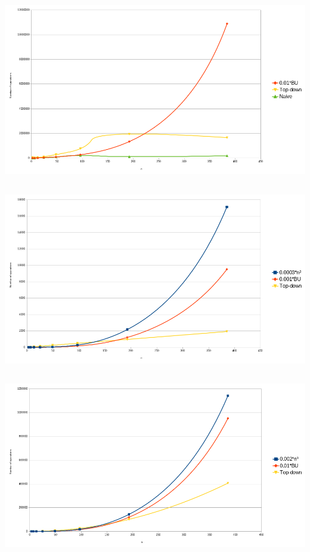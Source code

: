 \documentclass[twocolumn]{article}
\begin{document}
\subsection{ }
\begin{center}
  \label{fig:plr3}
  \includegraphics[width=\textwidth]{paren/time_paren_left_right}\\
\end{center}

\newpage
\subsection{ }
\begin{center}
  \label{fig:cplr}
  \includegraphics[width=\textwidth]{paren/complexity_closing_paren_left_right}
\end{center}
\newpage
\subsection{ }
\begin{center}
  \label{fig:plro}
  \includegraphics[width=\textwidth]{paren/complexity_paren_left_right_opening}
\end{center}
\newpage
\end{document}
